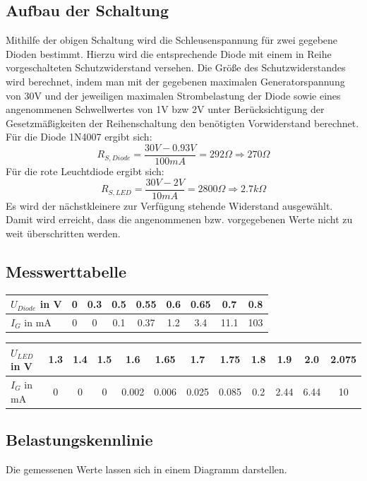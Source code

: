 \documentclass[
a4paper,     %
 headsepline, %
11pt         %
]{scrartcl}  %
\begin{document}
\subsection{Aufbau der Schaltung}

Mithilfe der obigen Schaltung wird die Schleusenspannung für zwei gegebene Dioden bestimmt. Hierzu wird die entsprechende Diode mit einem in Reihe vorgeschalteten Schutzwiderstand versehen. Die Größe des Schutzwiderstandes wird berechnet, indem man mit der gegebenen maximalen Generatorspannung von 30V und der jeweiligen maximalen Strombelastung der Diode sowie eines angenommenen Schwellwertes von 1V bzw 2V unter Berücksichtigung der Gesetzmäßigkeiten der Reihenschaltung den benötigten Vorwiderstand berechnet. \newline
Für die Diode 1N4007 ergibt sich:
\[R_{S,Diode}=\frac{30V-0.93V}{100mA}=292\Omega \Rightarrow 270\Omega\]
Für die rote Leuchtdiode ergibt sich:
\[R_{S,LED}=\frac{30V-2V}{10mA}=2800\Omega \Rightarrow 2.7k\Omega\]
Es wird der nächstkleinere zur Verfügung stehende Widerstand ausgewählt. Damit wird erreicht, dass die angenommenen bzw. vorgegebenen Werte nicht zu weit überschritten werden.

\subsection{Messwerttabelle}

  \begin{tabular}{ l | c | c | c | c | c | c | c | c }
    \hline
    $U_{Diode}$ in V & 0    & 0.3    & 0.5    & 0.55    & 0.6   & 0.65    & 0.7    & 0.8   \\ \hline
    $I_G$ in mA      & 0    & 0      & 0.1    & 0.37    & 1.2   & 3.4     & 11.1   & 103   \\
    \hline
  \end{tabular}
  \newline
  \begin{tabular}{ l | c | c | c | c | c | c | c | c | c | c | c }
    \hline
    $U_{LED}$ in V & 1.3  & 1.4 & 1.5 & 1.6   & 1.65  & 1.7   & 1.75   & 1.8  & 1.9  & 2.0  & 2.075 \\ \hline
    $I_G$ in mA    & 0    & 0   & 0   & 0.002 & 0.006 & 0.025 & 0.085  & 0.2  & 2.44 & 6.44 & 10    \\
    \hline
  \end{tabular}


\subsection{Belastungskennlinie}
Die gemessenen Werte lassen sich in einem Diagramm darstellen.
\end{document}
